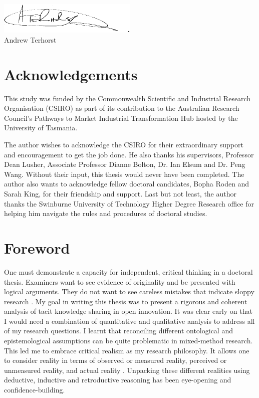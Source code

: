 \documentclass[12pt,table]{book}
\renewcommand{\today}{\the\day \ \monthname \ \the\year}
\begin{document}
\includegraphics[width = 0.5\textwidth]{Images/Signature.png}\\
Andrew Terhorst\\
\shortdate{\today}

\chapter*{Acknowledgements}

This study was funded by the Commonwealth Scientific and Industrial Research Organisation (CSIRO) as part of its contribution to the Australian Research Council's Pathways to Market Industrial Transformation Hub hosted by the University of Tasmania. \medskip

\noindent
The author wishes to acknowledge the CSIRO for their extraordinary support and encouragement to get the job done. He also thanks his supervisors, Professor Dean Lusher, Associate Professor Dianne Bolton, Dr. Ian Elsum and Dr. Peng Wang. Without their input, this thesis would never have been completed. The author also wants to acknowledge fellow doctoral candidates, Bopha Roden and Sarah King, for their friendship and support. Last but not least, the author thanks the Swinburne University of Technology Higher Degree Research office for helping him navigate the rules and procedures of doctoral studies.  

\chapter*{Foreword}

One must demonstrate a capacity for independent, critical thinking in a doctoral thesis. Examiners want to see evidence of originality and be presented with logical arguments. They do not want to see careless mistakes that indicate sloppy research \citep{mullins2002its}. My goal in writing this thesis was to present a rigorous and coherent analysis of tacit knowledge sharing in open innovation. It was clear early on that I would need a combination of quantitative and qualitative analysis to address all of my research questions. I learnt that reconciling different ontological and epistemological assumptions can be quite problematic in mixed-method research. This led me to embrace critical realism as my research philosophy. It allows one to consider reality in terms of observed or  measured reality, perceived or unmeasured reality, and actual reality \citep{bhaskar2013realist}. Unpacking these different realities using deductive, inductive and retroductive reasoning has been eye-opening and confidence-building. \medskip
\end{document}
